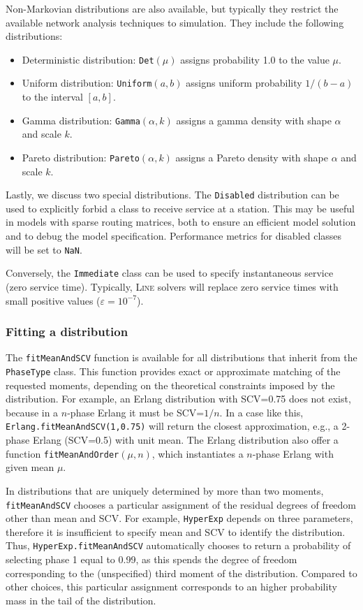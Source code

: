 Non-Markovian distributions are also available, but typically they restrict the available network analysis techniques to simulation. They include the following distributions:
\begin{itemize}
\item Deterministic distribution: \texttt{Det}$(\mu)$ assigns probability 1.0 to the value $\mu$.
\item Uniform distribution: \texttt{Uniform}$(a,b)$ assigns uniform probability $1/(b-a)$ to the interval $[a,b]$.
\item Gamma distribution: \texttt{Gamma}$(\alpha, k)$ assigns a gamma density with shape $\alpha$ and scale $k$.
\item Pareto distribution: \texttt{Pareto}$(\alpha, k)$ assigns a Pareto density with shape $\alpha$ and scale $k$.
\end{itemize}

Lastly, we discuss two special distributions. The \texttt{Disabled} distribution can be used to explicitly forbid a class to receive service at a station. This may be useful in models with sparse routing matrices, both to ensure an efficient model solution and to debug the model specification. Performance metrics for disabled classes will be set to \texttt{NaN}.

Conversely, the \texttt{Immediate} class can be used to specify instantaneous service (zero service time). Typically, \textsc{Line} solvers will replace zero service times with small positive values ($\varepsilon=10^{-7}$).

\subsubsection{Fitting a distribution}
The \texttt{fitMeanAndSCV} function is available for all distributions that inherit from the \texttt{PhaseType} class. This function provides exact or approximate matching of the requested moments, depending on the theoretical constraints imposed by the distribution. For example, an Erlang distribution with SCV=0.75 does not exist, because in a $n$-phase Erlang it must be SCV=$1/n$. In a case like this, \texttt{Erlang.fitMeanAndSCV(1,0.75)} will return the closest approximation, e.g., a 2-phase Erlang (SCV=0.5) with unit mean. The Erlang distribution also offer a function \texttt{fitMeanAndOrder}$(\mu,n)$, which instantiates a $n$-phase Erlang with given mean $\mu$.

In distributions that are uniquely determined by more than two moments, \texttt{fitMeanAndSCV} chooses a particular assignment of the residual degrees of freedom other than mean and SCV. For example, \texttt{HyperExp} depends on three parameters, therefore it is insufficient to specify mean and SCV to identify the distribution. Thus, \texttt{HyperExp.fitMeanAndSCV} automatically chooses to return a probability of selecting phase 1 equal to 0.99, as this spends the degree of freedom corresponding to the (unspecified) third moment of the distribution. Compared to other choices, this particular assignment corresponds to an higher probability mass in the tail of the distribution.


